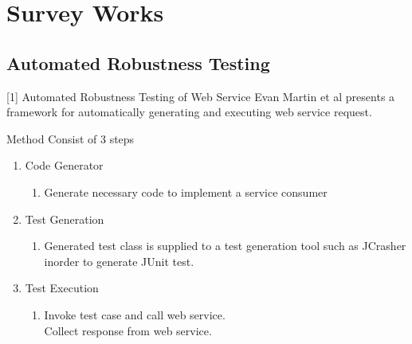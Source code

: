 \documentclass[10pt]{beamer}
\begin{document}
     
 \section{Survey Works}    
{\1
\begin{frame}
\begin{block}{}

  \end{block}
\end{frame}}
\subsection{Automated Robustness Testing }
\begin{frame}{[1] Automated Robustness Testing of Web Service}
	Evan Martin et al presents a framework for automatically generating and executing web service request.
	\begin{block}{Method}
	Consist of 3 steps
	\begin{enumerate}
	\item Code Generator
		\begin{enumerate}
		\item Generate necessary code to implement a service consumer
		\end{enumerate}
	\item Test Generation
		\begin{enumerate}
		
		\item Generated test class is supplied to a test generation tool such as JCrasher inorder to generate JUnit test.
		\end{enumerate}
	\item Test Execution
		\begin{enumerate}
		\item Invoke test case and call web service.\\
		Collect response from web service.
		\end{enumerate}
	
	\end{enumerate}
	
	\end{block}

\end{frame}
\end{document}

